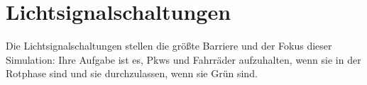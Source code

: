 %


\section{Lichtsignalschaltungen}\label{sec:lightsignals}

Die Lichtsignalschaltungen stellen die größte Barriere und der Fokus dieser Simulation: Ihre Aufgabe ist es, Pkws und Fahrräder aufzuhalten, wenn sie in der Rotphase sind und sie durchzulassen, wenn sie Grün sind.





